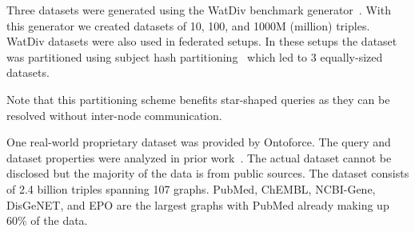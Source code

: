 
Three datasets were generated using the WatDiv benchmark generator~\cite{alucc2014diversified}. 
With this generator we created datasets of 10, 100, and 1000M (million) triples. 
WatDiv datasets were also used in federated setups. 
In these setups the dataset was partitioned using subject hash partitioning~\cite{Zeng, Harth} which led to 3 equally-sized datasets.

Note that this partitioning scheme benefits star-shaped queries as they can be resolved without inter-node communication.

One real-world proprietary dataset was provided by Ontoforce. 
The query and dataset properties were analyzed in prior work~\cite{dewitte_swat4ls_2016}. The actual dataset cannot be disclosed but the majority of the data is from public sources. The dataset consists of 2.4 billion triples spanning 107 graphs. 
PubMed, ChEMBL, NCBI-Gene, DisGeNET, and EPO are the largest graphs with PubMed already making up 60\% of the data.

